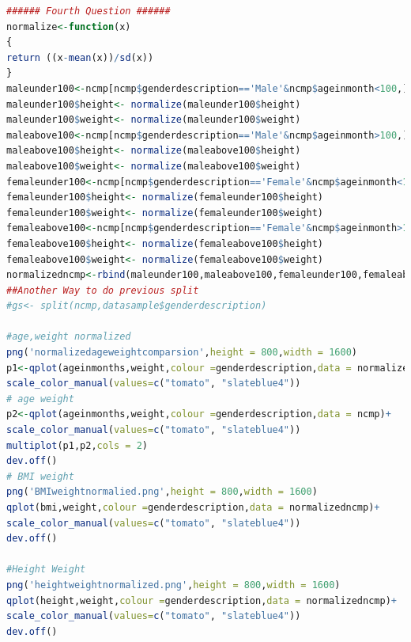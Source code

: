 \documentclass{article}
\begin{document}
	\begin{lstlisting}[language=R]
###### Fourth Question ######
normalize<-function(x)
{
return ((x-mean(x))/sd(x))
}
maleunder100<-ncmp[ncmp$genderdescription=='Male'&ncmp$ageinmonth<100,]
maleunder100$height<- normalize(maleunder100$height)
maleunder100$weight<- normalize(maleunder100$weight)
maleabove100<-ncmp[ncmp$genderdescription=='Male'&ncmp$ageinmonth>100,]
maleabove100$height<- normalize(maleabove100$height)
maleabove100$weight<- normalize(maleabove100$weight)
femaleunder100<-ncmp[ncmp$genderdescription=='Female'&ncmp$ageinmonth<100,]
femaleunder100$height<- normalize(femaleunder100$height)
femaleunder100$weight<- normalize(femaleunder100$weight)
femaleabove100<-ncmp[ncmp$genderdescription=='Female'&ncmp$ageinmonth>100,]
femaleabove100$height<- normalize(femaleabove100$height)
femaleabove100$weight<- normalize(femaleabove100$weight)
normalizedncmp<-rbind(maleunder100,maleabove100,femaleunder100,femaleabove100)
##Another Way to do previous split
#gs<- split(ncmp,datasample$genderdescription)

#age,weight normalized
png('normalizedageweightcomparsion',height = 800,width = 1600)
p1<-qplot(ageinmonths,weight,colour =genderdescription,data = normalizedncmp)+ 
scale_color_manual(values=c("tomato", "slateblue4"))
# age weight
p2<-qplot(ageinmonths,weight,colour =genderdescription,data = ncmp)+ 
scale_color_manual(values=c("tomato", "slateblue4"))
multiplot(p1,p2,cols = 2)
dev.off()
# BMI weight
png('BMIweightnormalied.png',height = 800,width = 1600)
qplot(bmi,weight,colour =genderdescription,data = normalizedncmp)+ 
scale_color_manual(values=c("tomato", "slateblue4"))
dev.off()

#Height Weight
png('heightweightnormalized.png',height = 800,width = 1600)
qplot(height,weight,colour =genderdescription,data = normalizedncmp)+ 
scale_color_manual(values=c("tomato", "slateblue4"))
dev.off()
	\end{lstlisting}
\end{document}
